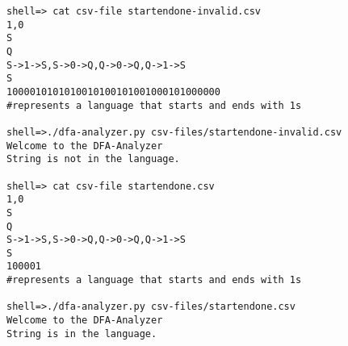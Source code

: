 \documentclass{article}
\begin{document}
\begin{lstlisting}
shell=> cat csv-file startendone-invalid.csv
1,0
S
Q
S->1->S,S->0->Q,Q->0->Q,Q->1->S
S
1000010101010010100101001000101000000
#represents a language that starts and ends with 1s

shell=>./dfa-analyzer.py csv-files/startendone-invalid.csv
Welcome to the DFA-Analyzer
String is not in the language.

shell=> cat csv-file startendone.csv
1,0
S
Q
S->1->S,S->0->Q,Q->0->Q,Q->1->S
S
100001
#represents a language that starts and ends with 1s

shell=>./dfa-analyzer.py csv-files/startendone.csv
Welcome to the DFA-Analyzer
String is in the language.

\end{lstlisting}
\end{document}

